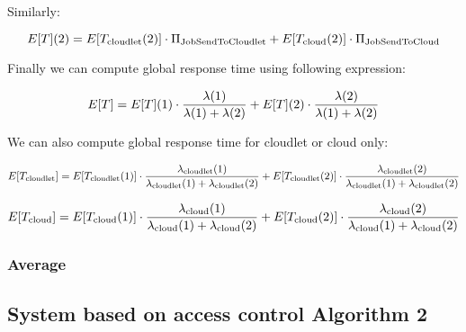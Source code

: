 \documentclass[10pt,a4paper]{article}
\begin{document}
Similarly:

\begin{equation}
E[T](2) = E[T_{\text{cloudlet}}(2)]\cdot \Pi_{\text{JobSendToCloudlet}} + E[T_{\text{cloud}}(2)]\cdot \Pi_{\text{JobSendToCloud}} \\
\end{equation}

Finally we can compute global response time using following expression:

\begin{equation}
E[T] = E[T](1) \cdot \dfrac{\lambda(1)}{\lambda(1) + \lambda(2)} + E[T](2) \cdot \dfrac{\lambda(2)}{\lambda(1) + \lambda(2)}\\
\end{equation}

We can also compute global response time for cloudlet or cloud only:

\begin{equation}
E[T_{\text{cloudlet}}] = E[T_{\text{cloudlet}}(1)] \cdot \dfrac{\lambda_{\text{cloudlet}}(1)}{\lambda_{\text{cloudlet}}(1) + \lambda_{\text{cloudlet}}(2)} + E[T_{\text{cloudlet}}(2)] \cdot \dfrac{\lambda_{\text{cloudlet}}(2)}{\lambda_{\text{cloudlet}}(1) + \lambda_{\text{cloudlet}}(2)} \\
\end{equation}

\begin{equation}
E[T_{\text{cloud}}] = E[T_{\text{cloud}}(1)] \cdot \dfrac{\lambda_{\text{cloud}}(1)}{\lambda_{\text{cloud}}(1) + \lambda_{\text{cloud}}(2)} + E[T_{\text{cloud}}(2)] \cdot \dfrac{\lambda_{\text{cloud}}(2)}{\lambda_{\text{cloud}}(1) + \lambda_{\text{cloud}}(2)} \\
\end{equation}



\subsubsection{Average }










\subsection{System based on access control Algorithm 2}
\end{document}
